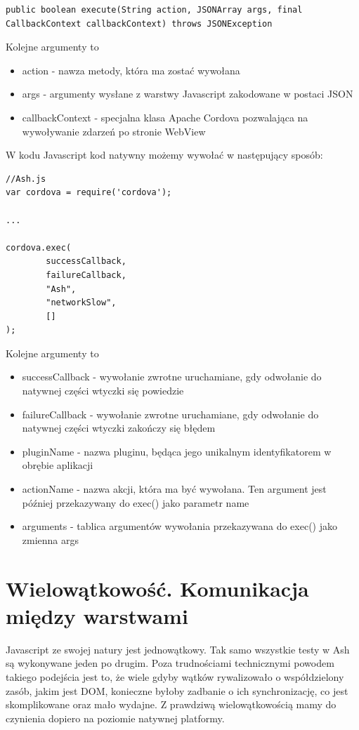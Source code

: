 \documentclass[brudnopis]{xmgr}
\begin{document}
\begin{lstlisting}
public boolean execute(String action, JSONArray args, final CallbackContext callbackContext) throws JSONException
\end{lstlisting}

Kolejne argumenty to
\begin{itemize}
  \item action - nawza metody, która ma zostać wywołana
  \item args - argumenty wysłane z warstwy Javascript zakodowane w postaci JSON
  \item callbackContext - specjalna klasa Apache Cordova pozwalająca na wywoływanie zdarzeń po stronie WebView 
\end{itemize}

W kodu Javascript kod natywny możemy wywołać w następujący sposób:

\begin{lstlisting}
//Ash.js
var cordova = require('cordova');

...

cordova.exec( 
        successCallback,
        failureCallback, 
        "Ash", 
        "networkSlow", 
        []
);
\end{lstlisting}

Kolejne argumenty to
\begin{itemize}
  \item successCallback - wywołanie zwrotne uruchamiane, gdy odwołanie do natywnej części wtyczki się powiedzie
  \item failureCallback - wywołanie zwrotne uruchamiane, gdy odwołanie do natywnej części wtyczki zakończy się błędem
  \item pluginName - nazwa pluginu, będąca jego unikalnym identyfikatorem w obrębie aplikacji
  \item actionName - nazwa akcji, która ma być wywołana. Ten argument jest później przekazywany do exec() jako parametr name 
\item arguments - tablica argumentów wywołania przekazywana do exec() jako zmienna args 
\end{itemize}

\section{Wielowątkowość. Komunikacja między warstwami}

Javascript ze swojej natury jest jednowątkowy. Tak samo wszystkie testy w Ash są wykonywane jeden po drugim. Poza trudnościami technicznymi powodem takiego podejścia jest to, że wiele gdyby wątków rywalizowało o współdzielony zasób, jakim jest DOM, konieczne byłoby zadbanie o ich synchronizację, co jest skomplikowane oraz mało wydajne. Z prawdziwą wielowątkowością mamy do czynienia dopiero na poziomie natywnej platformy.
\end{document}
